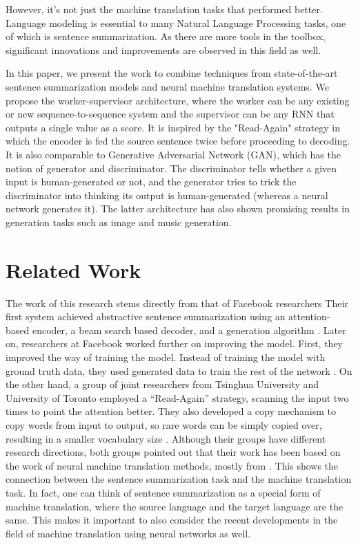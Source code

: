 \documentclass[letterpaper]{article} %
\begin{document}
However, it’s not just the machine translation tasks that performed better. Language modeling is essential to many Natural Language Processing tasks, one of which is sentence summarization. As there are more tools in the toolbox, significant innovations and improvements are observed in this field as well.

In this paper, we present the work to combine techniques from state-of-the-art sentence summarization models and neural machine translation systems. We propose the worker-supervisor architecture, where the worker can be any existing or new sequence-to-sequence system and the supervisor can be any RNN that outputs a single value as a score. It is inspired by the "Read-Again" strategy in which the encoder is fed the source sentence twice before proceeding to decoding. It is also comparable to Generative Adversarial Network (GAN), which has the notion of generator and discriminator. The discriminator tells whether a given input is human-generated or not, and the generator tries to trick the discriminator into thinking its output is human-generated (whereas a neural network generates it). The latter architecture has also shown promising results in generation tasks such as image and music generation.

\section{Related Work}
The work of this research stems directly from that of Facebook researchers Their first system achieved abstractive sentence summarization using an attention-based encoder, a beam search based decoder, and a generation algorithm \cite{rush2015neural}. Later on, researchers at Facebook worked further on improving the model. First, they improved the way of training the model. Instead of training the model with ground truth data, they used generated data to train the rest of the network \cite{ranzato2015sequence}. On the other hand, a group of joint researchers from Tsinghua University and University of Toronto employed a “Read-Again” strategy, scanning the input two times to point the attention better. They also developed a copy mechanism to copy words from input to output, so rare words can be simply copied over, resulting in a smaller vocabulary size \cite{zeng2016efficient}. Although their groups have different research directions, both groups pointed out that their work has been based on the work of neural machine translation methods, mostly from \cite{bahdanau2014neural}. This shows the connection between the sentence summarization task and the machine translation task. In fact, one can think of sentence summarization as a special form of machine translation, where the source language and the target language are the same. This makes it important to also consider the recent developments in the field of machine translation using neural networks as well.
\end{document}
